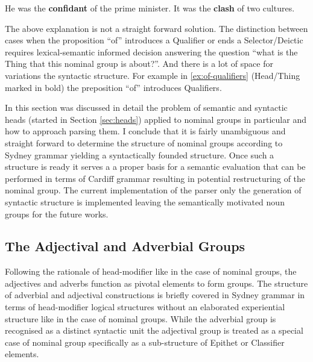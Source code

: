 \begin{exe}
    \ex \label{ex:of-qualifiers}He was the \textbf{confidant} of the prime minister.
    \ex It was the \textbf{clash} of two cultures.
\end{exe}

The above explanation is not a straight forward solution. The distinction between cases when the proposition ``of'' introduces a Qualifier or ends a Selector/Deictic requires lexical-semantic informed decision answering the question ``what is the Thing that this nominal group is about?''. And there is a lot of space for variations the syntactic structure. For example in \ref{ex:of-qualifiers} (Head/Thing marked in bold) the preposition ``of'' introduces Qualifiers.
 
In this section was discussed in detail the problem of semantic and syntactic heads (started in Section \ref{sec:heads}) applied to nominal groups in particular and how to approach parsing them. I conclude that it is fairly unambiguous and straight forward to determine the structure of nominal groups according to Sydney grammar yielding a syntactically founded structure. Once such a structure is ready it serves a a proper basis for a semantic evaluation that can be performed in terms of Cardiff grammar resulting in potential restructuring of the nominal group. The current implementation of the parser only the generation of syntactic structure is implemented leaving the semantically motivated noun groups for the future works. 

%
	
	\subsection{The Adjectival and Adverbial Groups}
	\label{sec:advectival-adverbial-groups}
	Following the rationale of head-modifier like in the case of nominal groups, the adjectives and adverbs function as pivotal elements to form groups. The structure of adverbial and adjectival constructions is briefly covered in Sydney grammar in terms of head-modifier logical structures without an elaborated experiential structure like in the case of nominal groups. While the adverbial group is recognised as a distinct syntactic unit the adjectival group is treated as a special case of nominal group specifically as a sub-structure of Epithet or Classifier elements.
	
